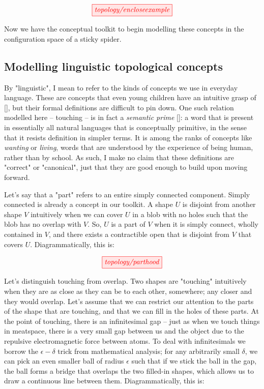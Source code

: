 \begin{fullwidth}
\[\tikzfig{topology/encloseexample}\]

Now we have the conceptual toolkit to begin modelling these concepts in the configuration space of a sticky spider.

\subsection{Modelling linguistic topological concepts}\label{sec:topconcept}

By "linguistic", I mean to refer to the kinds of concepts we use in everyday language. These are concepts that even young children have an intuitive grasp of [], but their formal definitions are difficult to pin down. One such relation modelled here -- touching -- is in fact a \emph{semantic prime} []: a word that is present in essentially all natural languages that is conceptually primitive, in the sense that it resists definition in simpler terms. It is among the ranks of concepts like \emph{wanting} or \emph{living}, words that are understood by the experience of being human, rather than by school. As such, I make no claim that these definitions are "correct" or "canonical", just that they are good enough to build upon moving forward.


Let's say that a "part" refers to an entire simply connected component. Simply connected is already a concept in our toolkit. A shape $U$ is disjoint from another shape $V$ intuitively when we can cover $U$ in a blob with no holes such that the blob has no overlap with $V$. So, $U$ is a part of $V$ when it is simply connect, wholly contained in $V$, and there exists a contractible open that is disjoint from $V$ that covers $U$. Diagrammatically, this is:

\[\tikzfig{topology/parthood}\]


Let's distinguish touching from overlap. Two shapes are "touching" intuitively when they are as close as they can be to each other, somewhere; any closer and they would overlap. Let's assume that we can restrict our attention to the parts of the shape that are touching, and that we can fill in the holes of these parts. At the point of touching, there is an infinitesimal gap -- just as when we touch things in meatspace, there is a very small gap between us and the object due to the repulsive electromagnetic force between atoms. To deal with infinitesimals we borrow the $\epsilon-\delta$ trick from mathematical analysis; for any arbitrarily small $\delta$, we can pick an even smaller ball of radius $\epsilon$ such that if we stick the ball in the gap, the ball forms a bridge that overlaps the two filled-in shapes, which allows us to draw a continuous line between them. Diagrammatically, this is: 


\end{fullwidth}
